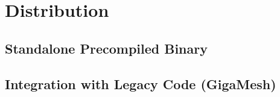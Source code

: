 \chapter{Distribution}



\section{Standalone Precompiled Binary}



\section{Integration with Legacy Code (GigaMesh)}
